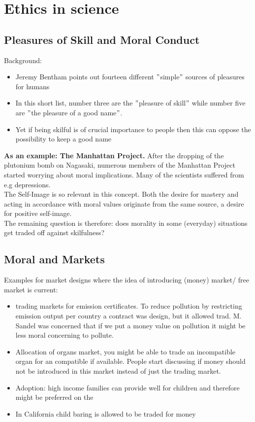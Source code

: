 

\chapter{Ethics in science}

\section{Pleasures of Skill and Moral Conduct}

Background:
\begin{itemize}
	\item Jeremy Bentham points out fourteen different $"$simple$"$ sources of pleasures for humans
	\item In this short list, number three are the $"$pleasure of skill$"$ while number five are $"$the pleasure of a good name$"$.
	\item Yet if being skilful is of crucial importance to people then this can oppose the possibility to keep a good name
\end{itemize}
  
  
  
\textbf{As an example: The Manhattan Project.} After the dropping of the plutonium bomb on Nagasaki, numerous members of the Manhattan Project started worrying about moral implications. Many of the scientists suffered from e.g depressions. \\ 

The Self-Image is so relevant in this concept. Both the desire for mastery and acting in accordance with moral values originate from the same source, a desire for positive self-image. \\ 

The remaining question is therefore: does morality in some (everyday) situations get traded off against skilfulness?


\section{Moral and Markets}

Examples for market designs where the idea of introducing (money) market/ free market is current:
\begin{itemize}
	\item trading markets for emission certificates. To reduce pollution by restricting emission output per country a contract was design, but it allowed trad. M. Sandel was concerned that if we put a money value on pollution it might be less moral concerning to pollute.
	\item Allocation of organs market, you might be able to trade an incompatible organ for an compatible if available. People start discussing if money should not be introduced in this market instead of just the trading market.
	\item Adoption: high income families can provide well for children and therefore might be preferred on the 
	\item In California child baring is allowed to be traded for money 
\end{itemize}


